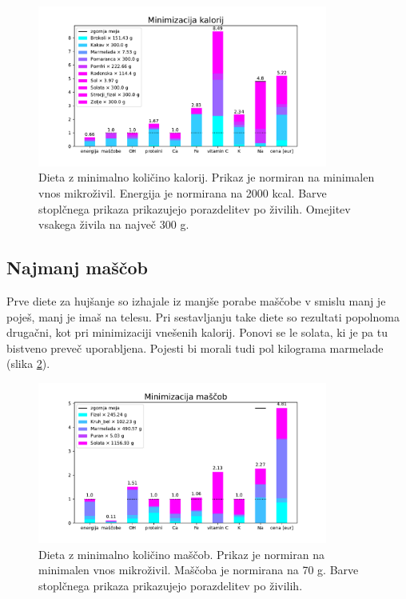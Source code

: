\documentclass[a4paper, 12pt, slovene]{article}
\numberwithin{equation}{section}
\begin{document}
\begin{figure}[H]
\centering
\includegraphics[width=0.85\textwidth]{grafi/graf_Low_calory_300.pdf}
\caption{Dieta z minimalno količino kalorij. Prikaz je normiran na minimalen vnos mikroživil. Energija je normirana na 2000 kcal. Barve stoplčnega prikaza prikazujejo porazdelitev po živilih. Omejitev vsakega živila na največ 300 g.}
\label{f:lowcal_300}
\end{figure}



\subsection{Najmanj maščob}
Prve diete za hujšanje so izhajale iz manjše porabe maščobe v smislu manj je poješ, manj je imaš na telesu. Pri sestavljanju take diete so rezultati popolnoma drugačni, kot pri minimizaciji vnešenih kalorij. Ponovi se le solata, ki je pa tu bistveno preveč uporabljena. Pojesti bi morali tudi pol kilograma marmelade (slika \ref{f:lowfat}).

\begin{figure}[H]
\centering
\includegraphics[width=0.85\textwidth]{grafi/graf_Low_fat_2000.pdf}
\caption{Dieta z minimalno količino maščob. Prikaz je normiran na minimalen vnos mikroživil. Maščoba je normirana na 70 g. Barve stoplčnega prikaza prikazujejo porazdelitev po živilih.}
\label{f:lowfat}
\end{figure}
\end{document}
